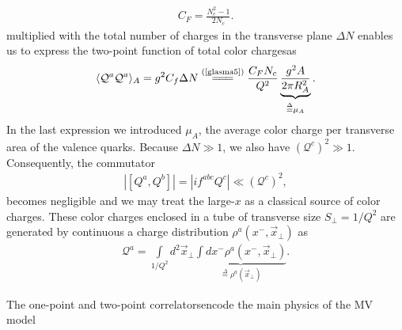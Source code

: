 \begin{note}
{    \begin{align*}
        C_F=\frac{N_c^2-1}{2N_c}.
    \end{align*}
    }multiplied with the total number of charges in the transverse plane $\Delta N$ enables us to express the two-point function of total color chargesas
    \begin{align}\label{glasma7}
        \langle \mathcal{Q}^a\mathcal{Q}^a\rangle_A=g^2C_f\Delta N\stackrel{(\text{\cref{glasma5}})}{=\joinrel=\joinrel=}\frac{C_FN_c}{Q^2}\underbrace{\frac{g^2A}{2\pi R_A^2}}_{\overset{\Delta}{=}\mu_A}.
    \end{align}
    In the last expression we introduced $\mu_A$, the average color charge per transverse area of the valence quarks. Because $\Delta N\gg 1$, we also have $\left(\mathcal{Q}^c\right)^2\gg 1$. Consequently, the commutator
    \begin{align*}
        \left|\left[Q^a,Q^b\right]\right|=\left|if^{abc}Q^c\right|\ll\left(\mathcal{Q}^c\right)^2,
    \end{align*}
    becomes negligible and we may treat the large-$x$ as a {\sffamily\color{ming}classical source} of color charges. These color charges enclosed in a tube of transverse size $S_\perp=1/Q^2$ are generated by continuous a charge distribution $\rho^a\left(x^-,\vec{x}_\perp\right)$ as
    \begin{align}\label{glasma8}
        \mathcal{Q}^a=\int\limits_{1/Q^2}d^2\vec{x}_\perp\underbrace{\int dx^-\rho^a\left(x^-,\vec{x}_\perp\right)}_{\overset{\Delta}{=}\rho^a\left(\vec{x}_\perp\right)}.
    \end{align}
\end{note}

The one-point and two-point correlatorsencode the main physics of the {\sffamily MV} model

\vspace{0.5cm}

